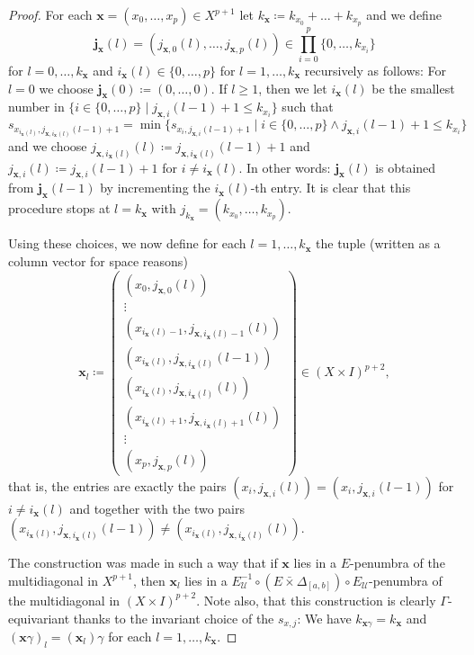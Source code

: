 \documentclass[pdftex]{sigma}
\numberwithin{equation}{section}
\theoremstyle{definition}
\newcommand{\cU}{\mathcal{U}}
\newcommand{\Diag}[1][]{{\Delta_{#1}}}
\newcommand{\swapcross}{\mathbin{\bar\times}}
\begin{document}
\begin{proof}
For each $\mathbf{x}=(x_0,\dots,x_p)\in X^{p+1}$ let $k_\mathbf{x}\coloneqq k_{x_0}+\dots+k_{x_p}$ and we define
\[
\mathbf{j}_\mathbf{x}(l)=(j_{\mathbf{x},0}(l),\dots,j_{\mathbf{x},p}(l))\in\prod_{i=0}^p\{0,\dots,k_{x_i}\}
\]
 for $l=0,\dots,k_\mathbf{x}$ and $i_\mathbf{x}(l)\in\{0,\dots,p\}$ for $l=1,\dots,k_\mathbf{x}$ recursively as follows: For $l=0$ we choose $\mathbf{j}_\mathbf{x}(0)\coloneqq(0,\dots,0)$.
If $l\geq 1$, then we let $i_\mathbf{x}(l)$ be the smallest number in $\{i\in\{0,\dots,p\}\mid j_{\mathbf{x},i}(l-1)+1\leq k_{x_i}\}$ such that
\[
s_{x_{i_\mathbf{x}(l)},j_{\mathbf{x},i_\mathbf{x}(l)}(l-1)+1}=\min\{s_{x_i,j_{\mathbf{x},i}(l-1)+1}\mid i\in\{0,\dots,p\}\wedge j_{\mathbf{x},i}(l-1)+1\leq k_{x_i}\}
\]
 and we choose $j_{\mathbf{x},i_\mathbf{x}(l)}(l)\coloneqq j_{\mathbf{x},i_\mathbf{x}(l)}(l-1)+1$ and $j_{\mathbf{x},i}(l)\coloneqq j_{\mathbf{x},i}(l-1)+1$ for $i\not=i_\mathbf{x}(l)$.
In other words: $\mathbf{j}_\mathbf{x}(l)$ is obtained from $\mathbf{j}_\mathbf{x}(l-1)$ by incrementing the $i_\mathbf{x}(l)$-th entry. It is clear that this procedure stops at $l=k_\mathbf{x}$ with $j_{k_\mathbf{x}}=(k_{x_0},\dots,k_{x_p})$.

Using these choices, we now define for each $l=1,\dots,k_\mathbf{x}$ the tuple (written as a column vector for space reasons)
\[
\mathbf{x}_l\coloneqq
\begin{pmatrix}
(x_0,j_{\mathbf{x},0}(l))
\\\vdots
\\(x_{i_\mathbf{x}(l)-1},j_{\mathbf{x},i_\mathbf{x}(l)-1}(l))
\\(x_{i_\mathbf{x}(l)},j_{\mathbf{x},i_\mathbf{x}(l)}(l-1))
\\(x_{i_\mathbf{x}(l)},j_{\mathbf{x},i_\mathbf{x}(l)}(l))
\\(x_{i_\mathbf{x}(l)+1},j_{\mathbf{x},i_\mathbf{x}(l)+1}(l))
\\\vdots
\\(x_p,j_{\mathbf{x},p}(l))
\end{pmatrix}\in (X\times I)^{p+2},
\]
that is, the entries are exactly the pairs $(x_i,j_{\mathbf{x},i}(l))=(x_i,j_{\mathbf{x},i}(l-1))$ for $i\not=i_\mathbf{x}(l)$ and together with the two pairs
$(x_{i_\mathbf{x}(l)},j_{\mathbf{x},i_\mathbf{x}(l)}(l-1))\not=(x_{i_\mathbf{x}(l)},j_{\mathbf{x},i_\mathbf{x}(l)}(l))$.

The construction was made in such a way that if $\mathbf{x}$ lies in a $E$-penumbra of the multidiagonal in $X^{p+1}$, then $\mathbf{x}_l$ lies in a $E_\cU^{-1}\circ (E\swapcross\Diag[{[a,b]}])\circ E_\cU$-penumbra of the multidiagonal in $(X\times I)^{p+2}$.
Note also, that this construction is clearly $\Gamma$-equivariant thanks to the invariant choice of the $s_{x,j}$: We have $k_{\mathbf{x}\gamma}=k_\mathbf{x}$ and $(\mathbf{x}\gamma)_l=(\mathbf{x}_l)\gamma$ for each $l=1,\dots,k_\mathbf{x}$.


\end{proof}
\end{document}
